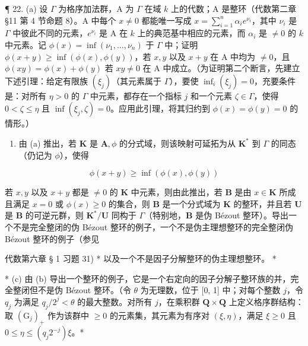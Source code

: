 ¶ 22. (a) 设 \(\Gamma\) 为格序加法群，A 为 \(\Gamma\) 在域 \(k\) 上的代数；A 是整环（代数第二章 §11 第 4 节命题 8）。A 中每个 \(x \neq 0\) 都能唯一写成 \(x = \sum_{i=1}^{n} \alpha_i e^{\nu_i}\)，其中 \(\nu_i\) 是 \(\Gamma\) 中彼此不同的元素，\(e^{\nu_i}\) 是 A 在 \(k\) 上的典范基中相应的元素，而 \(\alpha_i\) 是 \(\neq 0\) 的 \(k\) 中元素。记 \(\phi(x) = \inf(\nu_1, \ldots, \nu_n)\) 于 \(\Gamma\) 中；证明 \(\phi(x + y) \geqslant \inf(\phi(x), \phi(y))\)，若 \(x, y\) 以及 \(x + y\) 在 A 中均为 \(\neq 0\)，且 \(\phi(xy) = \phi(x) + \phi(y)\) 若 \(xy \neq 0\) 在 A 中成立。（为证明第二个断言，先建立下述引理：给定有限族 \((\xi_j)\)（其元素属于 \(\Gamma\)），要使 \(\inf_{i} (\xi_j) = 0\)，充要条件是：对所有 \(\eta > 0\) 的 \(\Gamma\) 中元素，都存在一个指标 \(j\) 和一个元素 \(\zeta \in \Gamma\)，使得 \(0 < \zeta \leqslant \eta\) 且 \(\inf(\xi_j, \zeta) = 0\)。应用此引理，将其归约到 \(\phi(x) = \phi(y) = 0\) 的情形。）

\begin{enumerate}
\def\labelenumi{(\alph{enumi})}
\setcounter{enumi}{1}
\tightlist
\item
  由 (a) 推出，若 \(\mathbf{K}\) 是 \(\mathbf{A},\phi\) 的分式域，则该映射可延拓为从 \(\mathbf{K}^*\) 到 \(\Gamma\) 的同态（仍记为 \(\phi\)），使得
\end{enumerate}

\[
\phi (x + y) \geqslant \inf (\phi (x), \phi (y))
\]

若 \(x, y\) 以及 \(x + y\) 都是 \(\neq 0\) 的 \(\mathbf{K}\) 中元素，则由此推出，若 \(\mathbf{B}\) 是由 \(x \in \mathbf{K}\) 所成且满足 \(x = 0\) 或 \(\phi(x) \geqslant 0\) 的集合，则 \(\mathbf{B}\) 是一个分式域为 \(\mathbf{K}\) 的整环，并且若 \(\mathbf{U}\) 是 \(\mathbf{B}\) 的可逆元群，则 \(\mathbf{K}^*/\mathbf{U}\) 同构于 \(\Gamma\)（特别地，\(\mathbf{B}\) 是伪 Bézout 整环）。导出一个不是完全整闭的伪 Bézout 整环的例子，一个不是伪主理想整环的完全整闭伪 Bézout 整环的例子（参见

代数第六章 § 1 习题 31) * 以及一个不是因子分解整环的伪主理想整环。 *

* (c) 由 (b) 导出一个整环的例子，它是一个右定向的因子分解子整环族的并，完全整闭但不是伪 Bézout 整环。（令 \(\theta\) 为无理数，位于 {[}0, 1{]} 中；对每个整数 \(j\)，令 \(q_j\) 为满足 \(q_j / 2^j < \theta\) 的最大整数。对所有 \(j\)，在乘积群 \(\mathbf{Q} \times \mathbf{Q}\) 上定义格序群结构：取 \((\mathrm{G}_j)_+\) 作为该群中 \(\geqslant 0\) 的元素集，其元素为有序对 \((\xi, \eta)\)，满足 \(\xi \geqslant 0\) 且 \(0 \leqslant \eta \leqslant (q_j 2^{-j}) \xi\)。*

